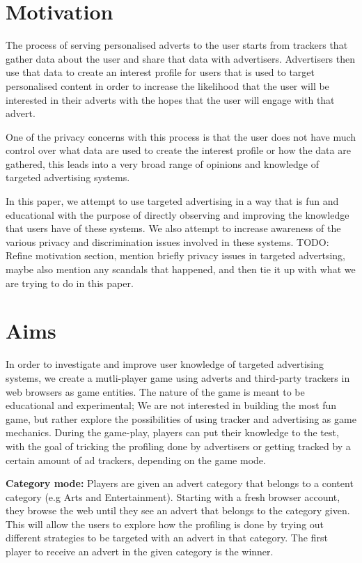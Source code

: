 \documentclass{l4proj}
\begin{document}
\section{Motivation}
The process of serving personalised adverts to the user starts from trackers that gather data about the user and share that data with advertisers. Advertisers then use that data to create an interest profile for users that is used to target personalised content in order to increase the likelihood that the user will be interested in their adverts with the hopes that the user will engage with that advert.

One of the privacy concerns with this process is that the user does not have much control over what data are used to create the interest profile or how the data are gathered, this leads into a very broad range of opinions and knowledge of targeted advertising systems.

In this paper, we attempt to use targeted advertising in a way that is fun and educational with the purpose of directly observing and improving the knowledge that users have of these systems. We also attempt to increase awareness of the various privacy and discrimination issues involved in these systems.
TODO: Refine motivation section, mention briefly privacy issues in targeted advertsing, maybe also mention any scandals that happened, and then tie it up with what we are trying to do in this paper.

\section{Aims}
In order to investigate and improve user knowledge of targeted advertising systems, we create a mutli-player game using adverts and third-party trackers in web browsers as game entities. The nature of the game is meant to be educational and experimental; We are not interested in building the most fun game, but rather explore the possibilities of using tracker and advertising as game mechanics. During the game-play, players can put their knowledge to the test, with the goal of tricking the profiling done by advertisers or getting tracked by a certain amount of ad trackers, depending on the game mode.

\textbf{Category mode:} Players are given an advert category that belongs to a content category (e.g Arts and Entertainment). Starting with a fresh browser account, they browse the web until they see an advert that belongs to the category given. This will allow the users to explore how the profiling is done by trying out different strategies to be targeted with an advert in that category. The first player to receive an advert in the given category is the winner. 
\end{document}
